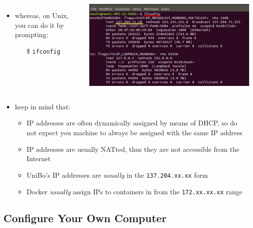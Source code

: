 \documentclass[presentation]{beamer}\mode<presentation>{\usetheme{AMSBolognaFC}}
\begin{document}
\begin{frame}[allowframebreaks]
\begin{columns}
        \begin{itemize}
            \item whereas, on Unix, you can do it by prompting:
            \begin{itemize}
                \item[\$] \texttt{ifconfig}
            \end{itemize}
        \end{itemize}
        \begin{center}
            \includegraphics[width=.9\linewidth]{figures/ifconfig.png}
        \end{center}
    \end{columns}

    \framebreak
    \begin{itemize}
        \item keep in mind that:
        \begin{itemize}
            \item IP addresses are often dynamically assigned by means of DHCP, so \alert{do not expect} you machine to always be assigned with the same IP address
            \item IP addresses are usually NATted, thus they are not accessible from the Internet
            \item UniBo's IP addresses are \emph{usually} in the \texttt{137.204.xx.xx} form
            \item Docker \emph{usually} assign IPs to containers in from the \texttt{172.xx.xx.xx} range
        \end{itemize}
    \end{itemize}

\end{frame}

\subsection{Configure Your Own Computer}
\end{document}

